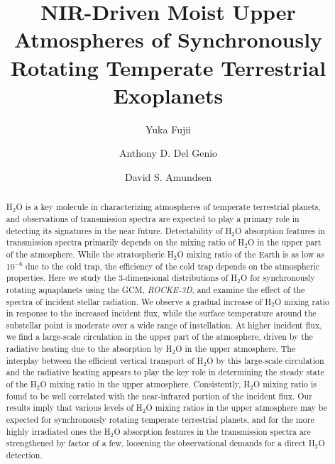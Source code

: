 \documentclass[11pt,numberedappendix,twocolappendix,]{emulateapj}
\def\water{H$_2$O }
\def\modelE{{\it ROCKE-3D}}
\begin{document}
\title{NIR-Driven Moist Upper Atmospheres of Synchronously Rotating Temperate Terrestrial Exoplanets}
\author{Yuka Fujii}
\author{Anthony D. Del Genio}
\author{David S. Amundsen}

\begin{abstract}

\water is a key molecule in characterizing atmospheres of temperate terrestrial planets, and observations of transmission spectra are expected to play a primary role in detecting its signatures in the near future. 
%
Detectability of \water absorption features in transmission spectra primarily depends on the mixing ratio of \water in the upper part of the atmosphere. 
%
While the stratospheric \water mixing ratio of the Earth is as low as $10^{-6}$ due to the cold trap, the efficiency of the cold trap depends on the atmospheric properties. 
%
Here we study the 3-dimensional distributions of \water for synchronously rotating aquaplanets using the GCM, \modelE, and examine the effect of the  spectra of incident stellar radiation. 
%
We observe a gradual increase of \water mixing ratio in response to the increased incident flux, while the surface temperature around the substellar point is moderate over a wide range of instellation. 
%
At higher incident flux, we find a large-scale circulation in the upper part of the atmosphere, driven by the radiative heating due to the absorption by \water in the upper atmosphere. 
%
The interplay between the efficient vertical transport of \water by this large-scale circulation and the radiative heating appears to play the key role in determining the steady state of the \water mixing ratio in the upper atmosphere.  
%
Consistently, \water mixing ratio is found to be well correlated with the near-infrared portion of the incident flux. 
%
Our results imply that various levels of \water mixing ratios in the upper atmosphere may be expected for synchronously rotating temperate terrestrial planets, and for the more highly irradiated ones the \water absorption features in the transmission spectra are strengthened by factor of a few, loosening the observational demands for a direct H$_2$O detection. 
%
\end{abstract}
\end{document}
